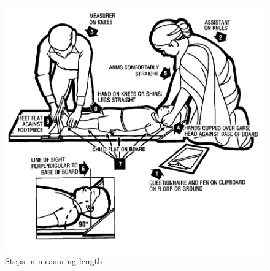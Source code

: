 \documentclass[12pt,]{book}
\theoremstyle{definition}
\theoremstyle{definition}
\theoremstyle{definition}
\theoremstyle{remark}
\begin{document}
\begin{figure}

{\centering \includegraphics[width=12.46in]{images/length} 

}

\caption{Steps in measuring length}\label{fig:height07}
\end{figure}
\end{document}
